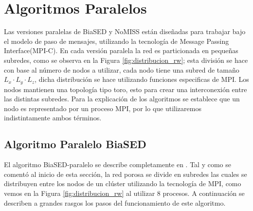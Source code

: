 \section{Algoritmos Paralelos}
\label{subsec:algspar}

Las versiones paralelas de BiaSED y NoMISS están diseñadas para trabajar bajo el modelo de paso de mensajes, utilizando la tecnología de 
Message Passing Interface(MPI-C). En cada versión paralela la red es particionada en pequeñas subredes, como se observa en la 
Figura \ref{fig:distribucion_rw}; esta división se hace con base al número de nodos a utilizar, cada nodo tiene una subred 
de tamaño $L_x \cdot L_y \cdot L_z$, dicha distribución se hace utilizando funciones especificas de MPI. Los nodos mantienen 
una topología tipo toro, esto para crear una interconexión entre las distintas subredes. Para la explicación de los algoritmos se
 establece que un nodo es representado por un proceso MPI, por lo que utilizaremos indistintamente ambos términos.

\subsection{Algoritmo Paralelo BiaSED}
\label{subsubsec:pbiased}
El algoritmo BiaSED-paralelo se describe completamente en \cite{ref4}. Tal y como se comentó al inicio de esta sección, la red 
porosa se divide en subredes las cuales se distribuyen entre los nodos de un clúster utilizando la tecnología de MPI, 
como vemos en la Figura \ref{fig:distribucion_rw} al utilizar 8 procesos. A continuación se describen a grandes rasgos los pasos del
funcionamiento de este algoritmo.


